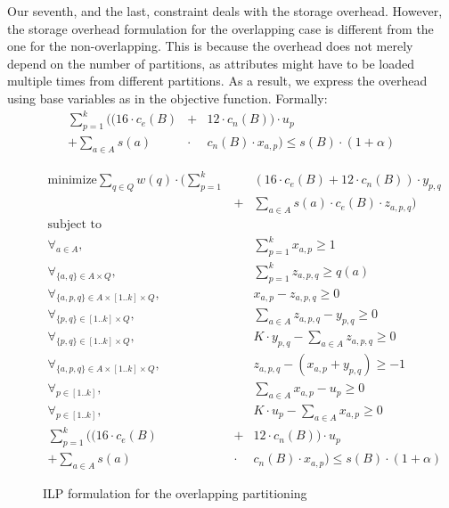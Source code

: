 Our seventh, and the last, constraint deals with the storage overhead. However,
the storage overhead formulation for the overlapping case is different from 
the one for the non-overlapping. This is because the overhead does not merely
depend on the number of partitions, as attributes might have to be loaded
multiple times from different partitions. As a result, we express the overhead
using base variables as in the objective function. Formally:
\begin{eqnarray}
\sum_{p=1}^{k} \Big((16\cdot c_e(B) &+& 12 \cdot c_n(B)) \cdot u_p  \nonumber \\ 
+ \sum_{a\in A} s(a) \!\!&\cdot&\!\! c_n(B)\cdot x_{a,p} \Big) \leq s(B)\cdot (1+\alpha)
\end{eqnarray}

\begin{figure}[!t]
\begin{mdframed}
\begin{eqnarray}
\text{minimize}  
    \sum_{q\in Q} w(q)\cdot \Big(\sum_{p=1}^{k} \!\!&&\!\! (16\cdot c_e(B) + 12\cdot c_n(B))\cdot y_{p,q}\nonumber\\
    &+& \sum_{a\in A} s(a)\cdot c_e(B)\cdot z_{a,p,q} \Big) \nonumber\\
\text{subject to}&&\nonumber\\
\forall_{a\in A}, 
    && \sum_{p=1}^{k} x_{a,p} \geq 1\nonumber\\
\forall_{\{a,q\}\in A\times Q},
    &&  \sum_{p=1}^{k} z_{a,p,q} \geq q(a) \nonumber\\
\forall_{\{a,p,q\}\in A\times [1..k]\times Q}, 
    && x_{a,p} - z_{a,p,q} \geq 0 \nonumber\\
\forall_{\{p,q\}\in [1..k]\times Q}, 
    &&  \sum_{a\in A} z_{a,p,q} - y_{p,q} \geq 0 \nonumber\\
\forall_{\{p,q\}\in [1..k]\times Q}, 
    &&  K\cdot y_{p,q} - \sum_{a\in A} z_{a,p,q}  \geq 0 \nonumber\\
\forall_{\{a,p,q\}\in A\times [1..k]\times Q}, 
    && z_{a,p,q} - (x_{a,p} + y_{p,q}) \geq -1 \nonumber\\
\forall_{p\in[1..k]},
    && \sum_{a\in A} x_{a,p} - u_p \geq 0 \nonumber\\
\forall_{p\in[1..k]},
    && K\cdot u_p - \sum_{a\in A} x_{a,p} \geq 0 \nonumber\\    
\sum_{p=1}^{k} \Big((16\cdot c_e(B) &+& 12 \cdot c_n(B)) \cdot u_p  \nonumber \\ 
+ \sum_{a\in A} s(a) \!\!&\cdot&\!\! c_n(B)\cdot x_{a,p}  \Big)\leq s(B)\cdot (1+\alpha)\nonumber
\end{eqnarray}
\end{mdframed}
\caption{ILP formulation for the overlapping partitioning}
\label{fig:ov-ilp}
\end{figure}


